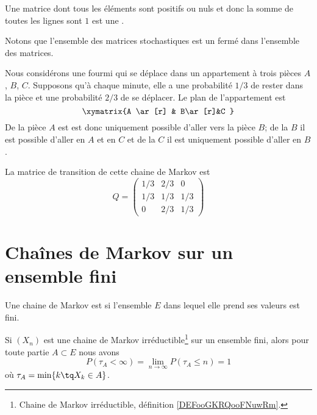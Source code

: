 \begin{definition}      \label{DefGJEBooZvuIAV}
	Une matrice dont tous les éléments sont positifs ou nuls et donc la somme de toutes les lignes sont \( 1\) est une .
\end{definition}
Notons que l'ensemble des matrices stochastiques est un fermé dans l'ensemble des matrices.

\begin{example}
	Nous considérons une fourmi qui se déplace dans un appartement à trois pièces \( A\), \( B\), \( C\). Supposons qu'à chaque minute, elle a une probabilité \( 1/3\) de rester dans la pièce et une probabilité \( 2/3\) de se déplacer. Le plan de l'appartement est
	\begin{equation}
		\xymatrix{%
			A \ar[r]      &  B\ar[r]&C
		}
	\end{equation}
	De la pièce \( A\) est est donc uniquement possible d'aller vers la pièce \( B\); de la \( B\) il est possible d'aller en \( A\) et en \( C\) et de la \( C\) il est uniquement possible d'aller en \( B\).

	La matrice de transition de cette chaine de Markov est
	\begin{equation}
		Q=\begin{pmatrix}
			1/3 & 2/3 & 0   \\
			1/3 & 1/3 & 1/3 \\
			0   & 2/3 & 1/3
		\end{pmatrix}
	\end{equation}
\end{example}


\section{Chaînes de Markov sur un ensemble fini}

\begin{definition}
	Une chaine de Markov est  si l'ensemble \( E\) dans lequel elle prend ses valeurs est fini.
\end{definition}

\begin{proposition}     \label{PROPooCAORooMEaxtq}
    Si \( (X_n)\) est une chaine de Markov irréductible\footnote{Chaine de Markov irréductible, définition \ref{DEFooGKRQooFNuwRm}.} sur un ensemble fini, alors pour toute partie \( A\subset E\) nous avons
	\begin{equation}
		P(\tau_A<\infty)=\lim_{n\to \infty} P(\tau_A\leq n)=1
	\end{equation}
	où \( \tau_A=\min\{ k\tq X_k\in A \}\).
\end{proposition}

